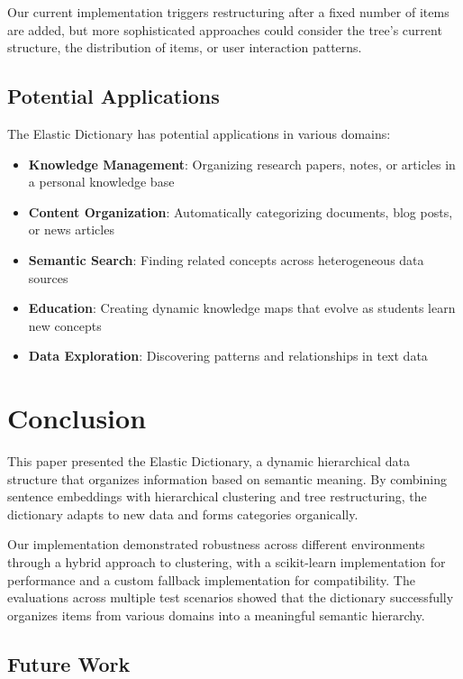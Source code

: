 \documentclass[conference]{IEEEtran}
\begin{document}
Our current implementation triggers restructuring after a fixed number of items are added, but more sophisticated approaches could consider the tree's current structure, the distribution of items, or user interaction patterns.

\subsection{Potential Applications}

The Elastic Dictionary has potential applications in various domains:

\begin{itemize}
    \item \textbf{Knowledge Management}: Organizing research papers, notes, or articles in a personal knowledge base
    \item \textbf{Content Organization}: Automatically categorizing documents, blog posts, or news articles
    \item \textbf{Semantic Search}: Finding related concepts across heterogeneous data sources
    \item \textbf{Education}: Creating dynamic knowledge maps that evolve as students learn new concepts
    \item \textbf{Data Exploration}: Discovering patterns and relationships in text data
\end{itemize}

\section{Conclusion}

This paper presented the Elastic Dictionary, a dynamic hierarchical data structure that organizes information based on semantic meaning. By combining sentence embeddings with hierarchical clustering and tree restructuring, the dictionary adapts to new data and forms categories organically.

Our implementation demonstrated robustness across different environments through a hybrid approach to clustering, with a scikit-learn implementation for performance and a custom fallback implementation for compatibility. The evaluations across multiple test scenarios showed that the dictionary successfully organizes items from various domains into a meaningful semantic hierarchy.

\subsection{Future Work}
\end{document}
